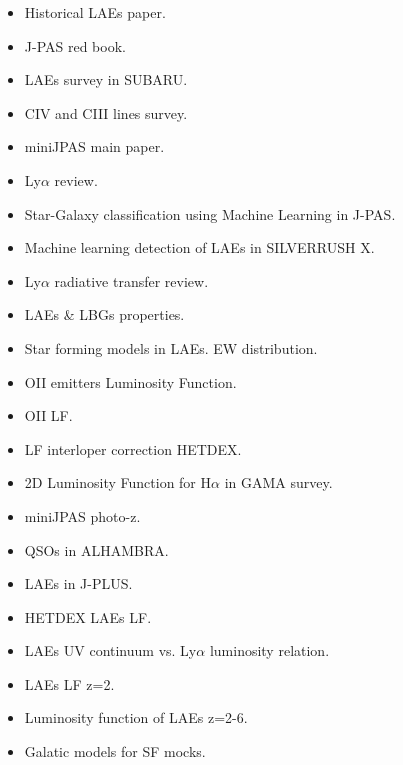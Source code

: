 \documentclass[a4paper,fleqn,usenatbib]{mnras}
\begin{document}
\begin{itemize}
    \item Historical LAEs paper. \cite{Partridge1967}
    \item J-PAS red book. \cite{benitez2014jpas}
    \item LAEs survey in SUBARU. \cite{ouchi2018}
    \item CIV and CIII lines survey. \cite{stroe2017}
    \item miniJPAS main paper. \cite{bonoli2020}
    \item Ly$\alpha$ review. \cite{ouchi2020}
    \item Star-Galaxy classification using Machine Learning in J-PAS. \cite{baqui2021}
    \item Machine learning detection of LAEs in SILVERRUSH X. \cite{ono2021}
    \item Ly$\alpha$ radiative transfer review. \cite{Dijkstra2019}
    \item LAEs \& LBGs properties. \cite{ArrabalHaro2020}
    \item Star forming models in LAEs. EW distribution. \cite{Charlot1993}
    \item OII emitters Luminosity Function. \cite{Ciardullo2013}
    \item OII LF. \cite{Gilbank2010}
    \item LF interloper correction HETDEX. \cite{Farrow2021}
    \item 2D Luminosity Function for H$\alpha$ in GAMA survey. \cite{Gunawardhana2002}
    \item miniJPAS photo-z. \cite{Hernan-Caballero2021}
    \item QSOs in ALHAMBRA. \cite{Matute2018}
    \item LAEs in J-PLUS. \cite{Spinoso2020}
    \item HETDEX LAEs LF. \cite{Zhang2021}
    \item LAEs UV continuum vs. Ly$\alpha$ luminosity relation. \cite{Santos2021}
    \item LAEs LF z=2. \cite{Konno2016}
    \item Luminosity function of LAEs z=2-6. \cite{Sobral2018}
    \item Galatic models for SF mocks. \cite{bruzual2003}
\end{itemize}




\end{document}
